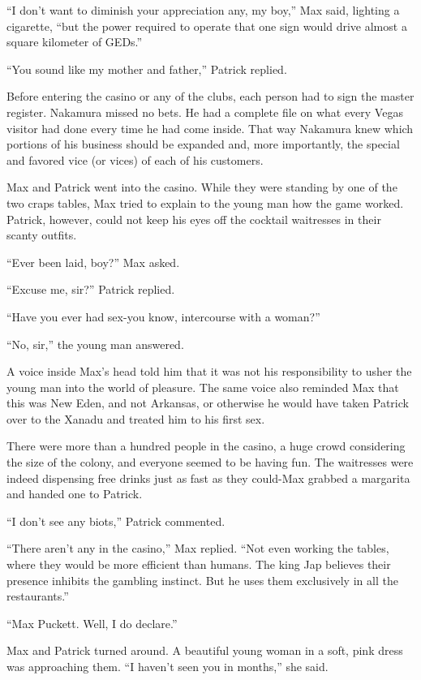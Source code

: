 \documentclass[]{article}
\begin{document}
{“I don’t want to diminish your appreciation any, my boy,” Max said, lighting a cigarette, “but the power required to operate that one sign would drive almost a square kilometer of GEDs.”

“You sound like my mother and father,” Patrick replied.

Before entering the casino or any of the clubs, each person had to sign the master register. Nakamura missed no bets. He had a complete file on what every Vegas visitor had done every time he had come inside. That way Nakamura knew which portions of his business should be expanded and, more importantly, the special and favored vice (or vices) of each of his customers.

Max and Patrick went into the casino. While they were standing by one of the two craps tables, Max tried to explain to the young man how the game worked. Patrick, however, could not keep his eyes off the cocktail waitresses in their scanty outfits.

“Ever been laid, boy?” Max asked.

“Excuse me, sir?” Patrick replied.

“Have you ever had sex-you know, intercourse with a woman?”

“No, sir,” the young man answered.

A voice inside Max’s head told him that it was not his responsibility to usher the young man into the world of pleasure. The same voice also reminded Max that this was New Eden, and not Arkansas, or otherwise he would have taken Patrick over to the Xanadu and treated him to his first sex.

There were more than a hundred people in the casino, a huge crowd considering the size of the colony, and everyone seemed to be having fun. The waitresses were indeed dispensing free drinks just as fast as they could-Max grabbed a margarita and handed one to Patrick.

“I don’t see any biots,” Patrick commented.

“There aren’t any in the casino,” Max replied. “Not even working the tables, where they would be more efficient than humans. The king Jap believes their presence inhibits the gambling instinct. But he uses them exclusively in all the restaurants.”

“Max Puckett. Well, I do declare.”

Max and Patrick turned around. A beautiful young woman in a soft, pink dress was approaching them. “I haven’t seen you in months,” she said.

}
\end{document}
